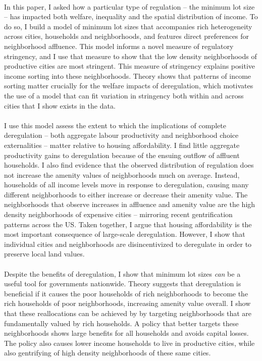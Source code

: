 \documentclass[12pt]{article}
\begin{document}
	\paragraph*{}
	In this paper, I asked how a particular type of regulation -- the minimum lot size -- has impacted both welfare, inequality and the spatial distribution of income. To do so, I build a model of minimum lot sizes that accompanies rich heterogeneity across cities, households and neighborhoods, and features direct preferences for neighborhood affluence. This model informs a novel measure of regulatory stringency, and I use that measure to show that the low density neighborhoods of productive cities are most stringent. This measure of stringency explains positive income sorting into these neighborhoods. Theory shows that patterns of income sorting matter crucially for the welfare impacts of deregulation, which motivates the use of a model that can fit variation in stringency both within and across cities that I show exists in the data.
	
	\paragraph*{}
	I use this model assess the extent to which the implications of complete deregulation -- both aggregate labour productivity and neighborhood choice externalities -- matter relative to housing affordability. I find little aggregate productivity gains to deregulation because of the ensuing outflow of affluent households. I also find evidence that the observed distribution of regulation does not increase the amenity values of neighborhoods much on average. Instead, households of all income levels move in response to deregulation, causing many different neighborhoods to either increase or decrease their amenity value. The neighborhoods that observe increases in affluence and amenity value are the high density neighborhoods of expensive cities -- mirroring recent gentrification patterns across the US. Taken together, I argue that housing affordability is the most important consequence of large-scale deregulation. However, I show that individual cities and neighborhoods are disincentivized to deregulate in order to preserve local land values.
	
	\paragraph*{}
	Despite the benefits of deregulation, I show that minimum lot sizes \textit{can} be a useful tool for governments nationwide. Theory suggests that deregulation is beneficial if it causes the poor households of rich neighborhoods to become the rich households of poor neighborhoods, increasing amenity value overall. I show that these reallocations can be achieved by by targeting neighborhoods that are fundamentally valued by rich households. A policy that better targets these neighborhoods shows large benefits for all households and avoids capital losses. The policy also causes lower income households to live in productive cities, while also gentrifying of high density neighborhoods of these same cities.
	
\end{document}
